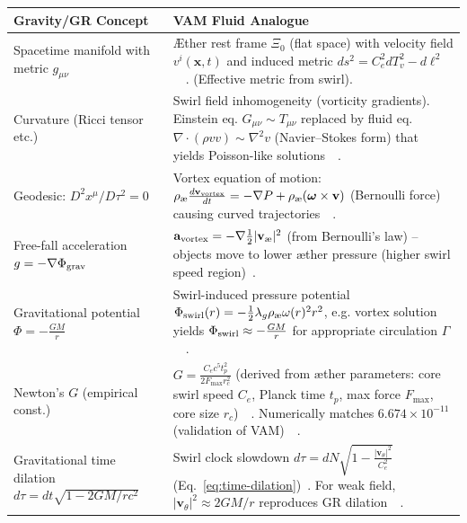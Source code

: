 \documentclass[a4paper,12pt]{article}
\begin{document}
    \begin{table}[H]
        \scriptsize
        \centering
        \begin{tabular}{p{} | p{}}
            \hline
            \textbf{Gravity/GR Concept} & \textbf{VAM Fluid Analogue} \\
            \hline
            Spacetime manifold with metric $g_{\mu\nu}$ & Æther rest frame $\Xi_0$ (flat space) with velocity field $v^i(\mathbf{x},t)$ and induced metric $ds^2 = C_e^2 dT_v^2 - d\ell^2$~\cite{reference_202}~\cite{reference_203}. (Effective metric from swirl). \\
            Curvature (Ricci tensor etc.) & Swirl field inhomogeneity (vorticity gradients). Einstein eq. $G_{\mu\nu} \sim T_{\mu\nu}$ replaced by fluid eq. $\nabla\cdot(\rho v v) \sim \nabla^2 v$ (Navier–Stokes form) that yields Poisson-like solutions~\cite{reference_204}~\cite{reference_205}. \\
            Geodesic: $D^2 x^\mu/D\tau^2 = 0$ & Vortex equation of motion: $\rho_{\text{\ae}}\frac{d\mathbf{v}_{\rm vortex}}{dt} = -\nabla P + \rho_{\text{\ae}}(\boldsymbol{\omega}\times \mathbf{v})$ (Bernoulli force) causing curved trajectories~\cite{reference_206}~\cite{reference_207}. \\
            Free-fall acceleration $g = -\nabla \Phi_{\rm grav}$ & $\mathbf{a}_{\rm vortex} = -\nabla \frac{1}{2}|\mathbf{v}_{\text{\ae}}|^2$ (from Bernoulli’s law) -- objects move to lower æther pressure (higher swirl speed region)~\cite{reference_208}. \\
            Gravitational potential $\Phi = -\frac{GM}{r}$ & Swirl-induced pressure potential $\Phi_{\rm swirl}(r) = -\frac{1}{2}\lambda_g \rho_{\text{\ae}} \omega(r)^2 r^2$, e.g. vortex solution yields $\Phi_{\rm swirl} \approx -\frac{GM}{r}$ for appropriate circulation $\Gamma$~\cite{reference_209}~\cite{reference_210}. \\
            Newton’s $G$ (empirical const.) & $G = \frac{C_e c^5 t_p^2}{2F_{\max} r_c^2}$ (derived from æther parameters: core swirl speed $C_e$, Planck time $t_p$, max force $F_{\max}$, core size $r_c$)~\cite{reference_211}~\cite{reference_212}. Numerically matches $6.674\times10^{-11}$ (validation of VAM)~\cite{reference_213}~\cite{reference_214}. \\
            Gravitational time dilation $d\tau = dt\sqrt{1-2GM/rc^2}$ & Swirl clock slowdown $d\tau = dN\sqrt{1 - \frac{|\mathbf{v}_\theta|^2}{C_e^2}}$ (Eq.~\ref{eq:time-dilation})~\cite{reference_215}. For weak field, $|\mathbf{v}_\theta|^2\approx 2GM/r$ reproduces GR dilation~\cite{reference_216}~\cite{reference_217}. \\

\end{tabular}
\end{table}
\end{document}

